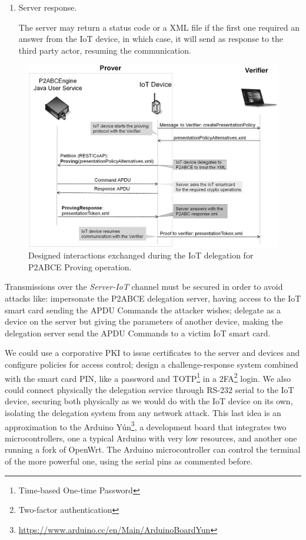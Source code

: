 \begin{enumerate}
	\hfil
	
	\item Server response.
	
	The server may return a status code or a XML file if the first one required an answer from the IoT device, in which case, it will send as response to the third party actor, resuming the communication.
	
\end{enumerate}

\begin{figure}[bth]
	\begin{center}
		\includegraphics[width=\linewidth]{gfx/UML/DelegationProving}
	\end{center}
	\caption{Designed interactions exchanged during the IoT delegation for P2ABCE Proving operation.}
	\label{fig:DelegationProving}
\end{figure}

Transmissions over the \textit{Server-IoT} channel must be secured in order to avoid attacks like: impersonate the P2ABCE delegation server, having access to the IoT smart card sending the APDU Commands the attacker wishes; delegate as a device on the server but giving the parameters of another device, making the delegation server send the APDU Commands to a victim IoT smart card.


We could use a corporative PKI to issue certificates to the server and devices and configure policies for access control; design a challenge-response system combined with the smart card PIN, like a password and TOTP\footnote{Time-based One-time Password} in a 2FA\footnote{Two-factor authentication} login. We also could connect physically the delegation service through RS-232 serial to the IoT device, securing both physically as we would do with the IoT device on its own, isolating the delegation system from any network attack. This last idea is an approximation to the Arduino Yún\footnote{\url{https://www.arduino.cc/en/Main/ArduinoBoardYun}}, a development board that integrates two microcontrollers, one a typical Arduino with very low resources, and another one running a fork of OpenWrt. The Arduino microcontroller can control the terminal of the more powerful one, using the serial pins as commented before.

